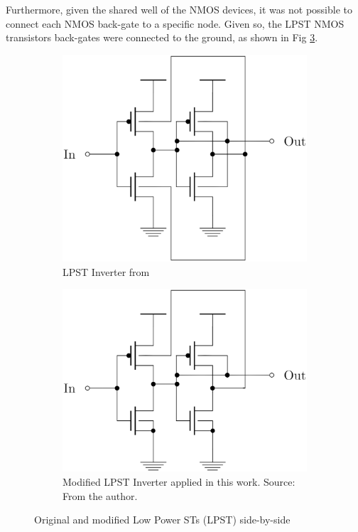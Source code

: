 \documentclass[diss,pgmicro,english]{iiufrgs}
\begin{document}
Furthermore, given the shared well of the NMOS devices, it was not possible to connect each NMOS back-gate to a specific node. Given so, the LPST NMOS transistors back-gates were connected to the ground, as shown in Fig \ref{fig:test}.

\begin{figure}[]
\centering
\begin{subfigure}{.45\textwidth}
  \centering
  \includegraphics[width=\linewidth]{STOriginal.eps}
  \caption{LPST Inverter from \citet{dokania2015circuit}}
  \label{fig:sub1}
\end{subfigure}%
\hspace{1em}
\begin{subfigure}{.45\textwidth}
  \centering
  \includegraphics[width=\linewidth]{STcorrigido.eps}
  \caption{Modified LPST Inverter applied in this work. Source: From the author.}
  \label{fig:sub2}
\end{subfigure}
\caption{Original and modified Low Power STs (LPST) side-by-side}
\label{fig:test}
\end{figure}
\end{document}
